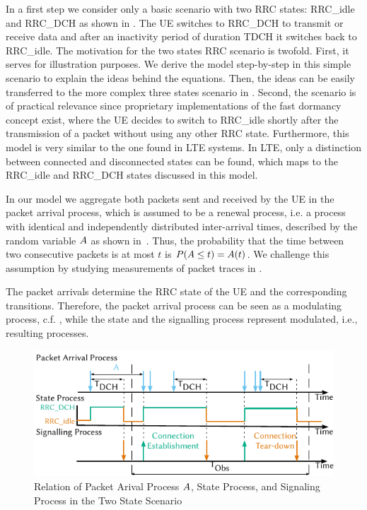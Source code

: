 In a first step we consider only a basic scenario with two \gls{RRC} states: \gls{RRC_idle} and \gls{RRC_DCH} as shown in .
The \gls{UE} switches to \gls{RRC_DCH} to transmit or receive data and after an inactivity period of duration \gls{TDCH} it switches back to \gls{RRC_idle}. 
The motivation for the two states \gls{RRC} scenario is twofold.
First, it serves for illustration purposes.
We derive the model step-by-step in this simple scenario to explain the ideas behind the equations.
Then, the ideas can be easily transferred to the more complex three states scenario in .
Second, the scenario is of practical relevance since proprietary implementations of the fast dormancy concept \cite{NSN2011} exist, where the \gls{UE} decides to switch to \gls{RRC_idle} shortly after the transmission of a packet without using any other \gls{RRC} state.
Furthermore, this model is very similar to the one found in \gls{LTE} systems.
In \gls{LTE}, only a distinction between connected and disconnected states can be found, which maps to the \gls{RRC_idle} and \gls{RRC_DCH} states discussed in this model.

In our model we aggregate both packets sent and received by the \gls{UE} in the packet arrival process, which is assumed to be a renewal process, i.e. a process  with identical and independently distributed inter-arrival times, described by the random variable \(A\) as shown in~.
Thus, the probability that the time between two consecutive packets is at most \(t\) is \(P(A \leq t) = A(t)\).
We challenge this assumption by studying measurements of packet traces in .

The packet arrivals determine the \gls{RRC} state of the \gls{UE} and the corresponding transitions. Therefore, the packet arrival process can be seen as a modulating process, c.f. \cite{TranGia1983,TranGia1988}, while the state and the signalling process represent modulated, i.e., resulting processes.

\begin{figure}
  \centering
  \includegraphics{network/performance_model/analytical_model/figures/arrival_process}
  \caption{Relation of Packet Arival Process \(A\), State Process, and Signaling Process in the Two State Scenario}
  \label{fig:network:performance_model:system_description:arrival_process}
\end{figure}

